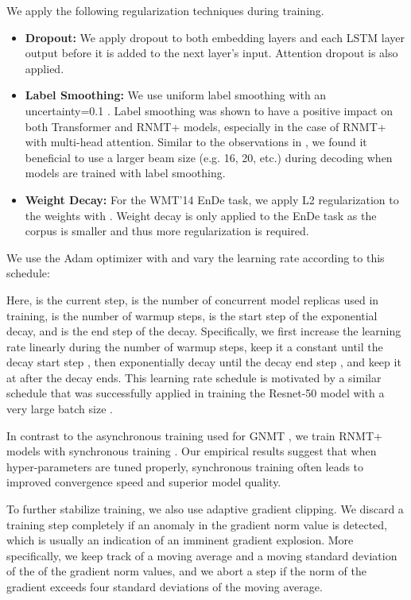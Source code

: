 \documentclass[11pt,a4paper]{article}
\begin{document}
We apply the following regularization techniques during training.
\begin{itemize}
\item \textbf{Dropout:} We apply dropout to both embedding layers and each LSTM
 layer output before it is added to the next layer's input. Attention dropout is also applied.

\item \textbf{Label Smoothing:} We use uniform label smoothing with an
  uncertainty=0.1 \cite{DBLP:journals/corr/SzegedyVISW15}. Label smoothing was shown to have a positive impact on both
Transformer and RNMT+ models, especially in the case of RNMT+ with
multi-head attention. Similar to the observations in \cite{DBLP:journals/corr/ChorowskiJ16}, we found it beneficial to use a larger beam size
(e.g. 16, 20, etc.) during decoding when models are trained with label
smoothing.

\item \textbf{Weight Decay:} For the WMT'14 EnDe task, we apply L2
regularization to the weights with . Weight decay is only
applied to the EnDe task as the corpus is smaller and thus more
regularization is required.
\end{itemize}


We use the Adam optimizer \cite{DBLP:journals/corr/KingmaB14} with  and vary the learning rate according to this schedule:

Here,  is the current step,  is the number of concurrent model replicas used in training, 
is the number of warmup steps,  is the start step of the exponential decay, and
 is the end step of the decay. Specifically, we first increase the learning
rate linearly during the  number of warmup steps, keep it a constant until the
decay start step , then exponentially decay until the decay end step ,
and keep it at  after the decay ends. This learning rate
schedule is motivated by a similar schedule that was successfully
applied in training the Resnet-50 model with a very large batch size
\cite{DBLP:journals/corr/GoyalDGNWKTJH17}.

In contrast to the asynchronous training used for GNMT
\cite{downpoursgd}, we train RNMT+ models with synchronous training
\cite{DBLP:journals/corr/ChenMBJ16}. Our empirical results suggest that when
hyper-parameters are tuned properly, synchronous training often leads
to improved convergence speed and superior model quality.

To further stabilize training, we also use adaptive
gradient clipping. We discard a training step completely if an anomaly
in the gradient norm value is
detected, which is usually an indication of an imminent gradient explosion.
More specifically, we keep track of a moving average and a moving
standard deviation of the  of the gradient norm values, and we
abort a step if the norm of the gradient exceeds four standard deviations
of the moving average.
\end{document}
